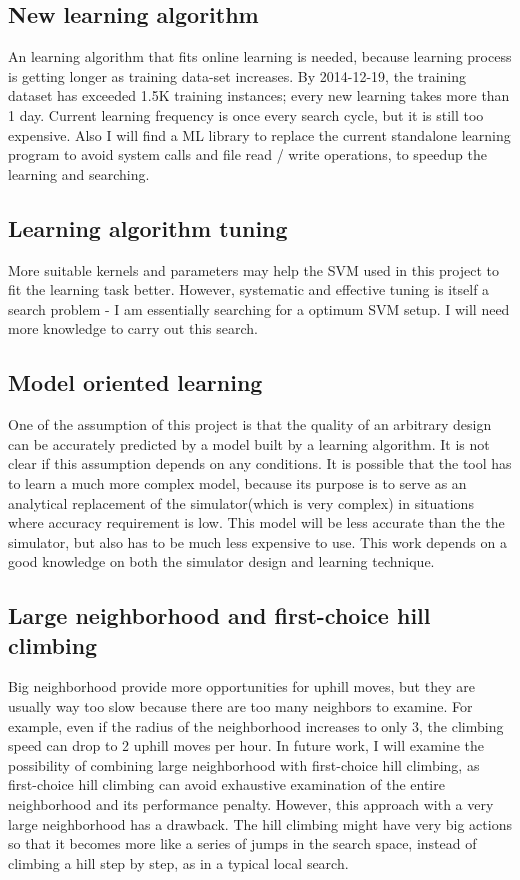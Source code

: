 \documentclass[12pt]{article}
\theoremstyle{definition}
\begin{document}
\subsection{New learning algorithm}
An learning algorithm that fits online learning is needed, because learning process is getting longer as training data-set increases. By 2014-12-19, the training dataset has exceeded 1.5K training instances; every new learning takes more than 1 day. Current learning frequency is once every search cycle, but it is still too expensive. Also I will find a ML library to replace the current standalone learning program to avoid system calls and file read / write operations, to speedup the learning and searching.
\subsection{Learning algorithm tuning}
More suitable kernels and parameters may help the SVM used in this project to fit the learning task better. However, systematic and effective tuning is itself a search problem - I am essentially searching for a optimum SVM setup. I will need more knowledge to carry out this search.
\subsection{Model oriented learning}
One of the assumption of this project is that the quality of an arbitrary design can be accurately predicted by a model built by a learning algorithm. It is not clear if this assumption depends on any conditions. It is possible that the tool has to learn a much more complex model, because its purpose is to serve as an analytical replacement of the simulator(which is very complex) in situations where accuracy requirement is low. This model will be less accurate than the the simulator, but also has to be much less expensive to use. This work depends on a good knowledge on both the simulator design and learning technique.
\subsection{Large neighborhood and first-choice hill climbing}
Big neighborhood provide more opportunities for uphill moves, but they are usually way too slow because there are too many neighbors to examine. For example, even if the radius of the neighborhood increases to only 3, the climbing speed can drop to 2 uphill moves per hour. In future work, I will examine the possibility of combining large neighborhood with first-choice hill climbing, as first-choice hill climbing can avoid exhaustive examination of the entire neighborhood and its performance penalty. However, this approach with a very large neighborhood has a drawback. The hill climbing might have very big actions so that it becomes more like a series of jumps in the search space, instead of climbing a hill step by step, as in a typical local search.
\end{document}
